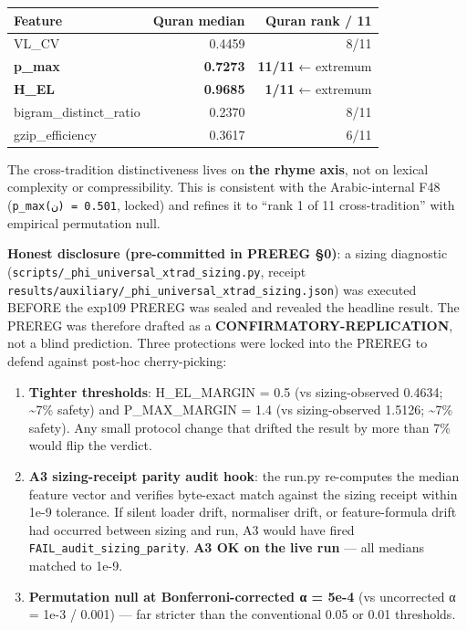 \documentclass[
]{article}
\newcounter{none} %
\providecommand{\tightlist}{%
  \setlength{\itemsep}{0pt}\setlength{\parskip}{0pt}}
\begin{document}
{\def\LTcaptype{none} %
\begin{longtable}[]{@{}lrr@{}}
\toprule\noalign{}
Feature & Quran median & Quran rank / 11 \\
\midrule\noalign{}
\endhead
\bottomrule\noalign{}
\endlastfoot
VL\_CV & 0.4459 & 8/11 \\
\textbf{p\_max} & \textbf{0.7273} & \textbf{11/11} ← extremum \\
\textbf{H\_EL} & \textbf{0.9685} & \textbf{1/11} ← extremum \\
bigram\_distinct\_ratio & 0.2370 & 8/11 \\
gzip\_efficiency & 0.3617 & 6/11 \\
\end{longtable}
}

The cross-tradition distinctiveness lives on \textbf{the rhyme axis},
not on lexical complexity or compressibility. This is consistent with
the Arabic-internal F48 (\texttt{p\_max(ن)\ =\ 0.501}, locked) and
refines it to ``rank 1 of 11 cross-tradition'' with empirical
permutation null.

\textbf{Honest disclosure (pre-committed in PREREG §0)}: a sizing
diagnostic (\texttt{scripts/\_phi\_universal\_xtrad\_sizing.py}, receipt
\texttt{results/auxiliary/\_phi\_universal\_xtrad\_sizing.json}) was
executed BEFORE the exp109 PREREG was sealed and revealed the headline
result. The PREREG was therefore drafted as a
\textbf{CONFIRMATORY-REPLICATION}, not a blind prediction. Three
protections were locked into the PREREG to defend against post-hoc
cherry-picking:

\begin{enumerate}
\def\labelenumi{\arabic{enumi}.}
\tightlist
\item
  \textbf{Tighter thresholds}: H\_EL\_MARGIN = 0.5 (vs sizing-observed
  0.4634; \textasciitilde7\% safety) and P\_MAX\_MARGIN = 1.4 (vs
  sizing-observed 1.5126; \textasciitilde7\% safety). Any small protocol
  change that drifted the result by more than 7\% would flip the
  verdict.
\item
  \textbf{A3 sizing-receipt parity audit hook}: the run.py re-computes
  the median feature vector and verifies byte-exact match against the
  sizing receipt within 1e-9 tolerance. If silent loader drift,
  normaliser drift, or feature-formula drift had occurred between sizing
  and run, A3 would have fired \texttt{FAIL\_audit\_sizing\_parity}.
  \textbf{A3 OK on the live run} --- all medians matched to 1e-9.
\item
  \textbf{Permutation null at Bonferroni-corrected α = 5e-4} (vs
  uncorrected α = 1e-3 / 0.001) --- far stricter than the conventional
  0.05 or 0.01 thresholds.
\end{enumerate}
\end{document}
